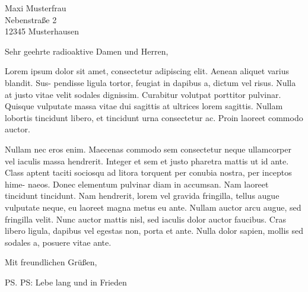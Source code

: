 \documentclass[fontsize=12pt, paper=a4]{m4letter}
\date{\today}
\begin{document}
\begin{letter}{%
  Maxi Musterfrau\\
  Nebenstraße  2\\
  12345 Musterhausen\\
}

\subject{On Mesons and Bosons}

\opening{Sehr geehrte radioaktive Damen und Herren,}

Lorem ipsum dolor sit amet, consectetur adipiscing elit. Aenean aliquet varius
blandit. Sus- pendisse ligula tortor, feugiat in dapibus a, dictum vel
risus. Nulla at justo vitae velit sodales dignissim. Curabitur volutpat
porttitor pulvinar. Quisque vulputate massa vitae dui sagittis at ultrices lorem
sagittis. Nullam lobortis tincidunt libero, et tincidunt urna consectetur ac.
Proin laoreet commodo auctor.

Nullam nec eros enim. Maecenas commodo sem
consectetur neque ullamcorper vel iaculis massa hendrerit. Integer et sem et
justo pharetra mattis ut id ante. Class aptent taciti sociosqu ad litora
torquent per conubia nostra, per inceptos hime- naeos. Donec elementum pulvinar
diam in accumsan. Nam laoreet tincidunt tincidunt. Nam hendrerit, lorem vel
gravida fringilla, tellus augue vulputate neque, eu laoreet magna metus eu
ante. Nullam auctor arcu augue, sed fringilla velit. Nunc auctor mattis nisl,
sed iaculis dolor auctor faucibus. Cras libero ligula, dapibus vel egestas non,
porta et ante. Nulla dolor sapien, mollis sed sodales a, posuere vitae ante.

\closing{Mit freundlichen Grüßen,}



\ps{PS:} Lebe lang und in Frieden

\end{letter}
\end{document}
